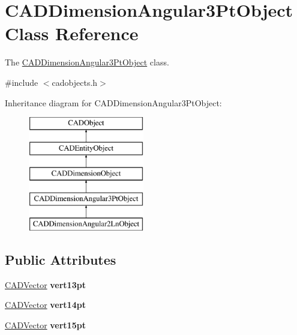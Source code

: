 \hypertarget{class_c_a_d_dimension_angular3_pt_object}{}\section{C\+A\+D\+Dimension\+Angular3\+Pt\+Object Class Reference}
\label{class_c_a_d_dimension_angular3_pt_object}


The \hyperlink{class_c_a_d_dimension_angular3_pt_object}{C\+A\+D\+Dimension\+Angular3\+Pt\+Object} class.  




{\ttfamily \#include $<$cadobjects.\+h$>$}

Inheritance diagram for C\+A\+D\+Dimension\+Angular3\+Pt\+Object\+:\begin{figure}[H]
\begin{center}
\leavevmode
\includegraphics[height=5.000000cm]{class_c_a_d_dimension_angular3_pt_object}
\end{center}
\end{figure}
\subsection*{Public Attributes}
\begin{DoxyCompactItemize}
\item 
\hyperlink{class_c_a_d_vector}{C\+A\+D\+Vector} {\bfseries vert13pt}\hypertarget{class_c_a_d_dimension_angular3_pt_object_ace0e55e86f30e603c998b6adbf233584}{}\label{class_c_a_d_dimension_angular3_pt_object_ace0e55e86f30e603c998b6adbf233584}

\item 
\hyperlink{class_c_a_d_vector}{C\+A\+D\+Vector} {\bfseries vert14pt}\hypertarget{class_c_a_d_dimension_angular3_pt_object_a31fb70168881a8f5675a62d37f4aa16b}{}\label{class_c_a_d_dimension_angular3_pt_object_a31fb70168881a8f5675a62d37f4aa16b}

\item 
\hyperlink{class_c_a_d_vector}{C\+A\+D\+Vector} {\bfseries vert15pt}\hypertarget{class_c_a_d_dimension_angular3_pt_object_aa3db7ff197556d336112fee3c3b845c1}{}\label{class_c_a_d_dimension_angular3_pt_object_aa3db7ff197556d336112fee3c3b845c1}

\end{DoxyCompactItemize}
